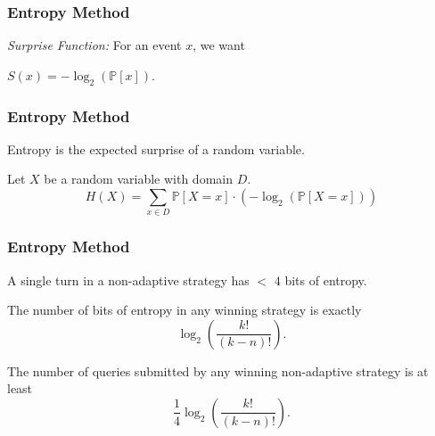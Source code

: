 \documentclass{beamer}
\begin{document}
    \begin{frame}
    \frametitle{Entropy Method}
    \textit{Surprise Function:} For an event $x$, we want
	\begin{tcolorbox}[colback=blue!5,colframe=blue!40!black,title=Definition (Surprise Function)]
    	\begin{enumerate}[label=\arabic*.]
	\end{enumerate}
	\end{tcolorbox}

	\begin{tcolorbox}[colback=blue!5,colframe=blue!40!black,title=Unique Surprise Function]
	$S(x)=-\log_2(\mathbb{P}[x])$.
	\end{tcolorbox}
	\end{frame}
	
	\begin{frame}
	\frametitle{Entropy Method}
	Entropy is the expected surprise of a random variable. \\ \vspace{\baselineskip}
	\onslide<2->\begin{tcolorbox}[colback=blue!5,colframe=blue!40!black,title=Definition (Entropy)]
	Let $X$ be a random variable with domain $D$.
			\begin{equation*}
			H(X) = \sum_{x\in D}\mathbb{P}[X=x]\cdot(-\log_2\left(\mathbb{P}[X=x]\right))
			\end{equation*}
	\end{tcolorbox}
    \end{frame}
 
    \begin{frame}
    \frametitle{Entropy Method}
	\begin{tcolorbox}[colback=blue!5,colframe=blue!40!black,title=Lemma]
	A single turn in a non-adaptive strategy has $<$ $4$ bits of entropy.
	\end{tcolorbox}
	\begin{tcolorbox}[colback=blue!5,colframe=blue!40!black,title=Lemma]
	The number of bits of entropy in any winning strategy is exactly 
	\begin{equation*}
	\log_2 \left(\frac{k!}{(k-n)!}\right).
	\end{equation*}
	\end{tcolorbox}
	\begin{tcolorbox}[colback=blue!5,colframe=blue!40!black,title=Theorem]
	The number of queries submitted by any winning non-adaptive strategy is at least
	\begin{equation*}
	\frac{1}{4}\log_2 \left(\frac{k!}{(k-n)!}\right).
	\end{equation*}
	\end{tcolorbox}
    \end{frame}
   
\end{document}
